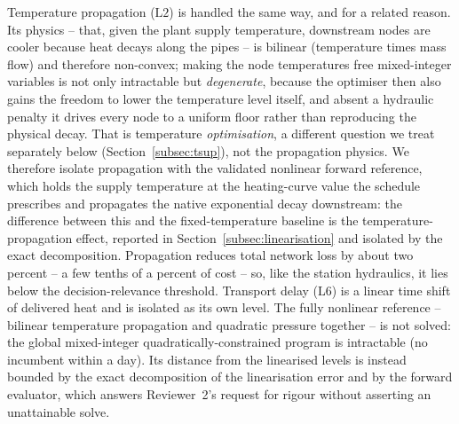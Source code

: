 \documentclass[a4paper,fleqn]{cas-dc}
\newcommand{\Ltwo}{\ensuremath{\mathrm{L2}}}    %
\newcommand{\Lsix}{\ensuremath{\mathrm{L6}}}    %
\begin{document}
Temperature propagation ($\Ltwo$) is handled the same way, and for a related reason. Its physics
-- that, given the plant supply temperature, downstream nodes are cooler because heat decays
along the pipes -- is bilinear (temperature times mass flow) and therefore non-convex; making the
node temperatures free mixed-integer variables is not only intractable but \emph{degenerate},
because the optimiser then also gains the freedom to lower the temperature level itself, and
absent a hydraulic penalty it drives every node to a uniform floor rather than reproducing the
physical decay. That is temperature \emph{optimisation}, a different question we treat separately
below (Section~\ref{subsec:tsup}), not the propagation physics. We therefore isolate propagation
with the validated nonlinear forward reference, which holds the supply temperature at the
heating-curve value the schedule prescribes and propagates the native exponential decay
downstream: the difference between this and the fixed-temperature baseline is the
temperature-propagation effect, reported in Section~\ref{subsec:linearisation} and isolated by
the exact decomposition. Propagation reduces total network loss by about two percent -- a few
tenths of a percent of cost -- so, like the station hydraulics, it lies below the
decision-relevance threshold.
Transport delay ($\Lsix$) is a linear time shift of delivered heat and is isolated as its own
level. The fully nonlinear reference -- bilinear temperature propagation and quadratic
pressure together -- is not solved: the global mixed-integer quadratically-constrained program
is intractable (no incumbent within a day). Its distance from the linearised levels is instead
bounded by the exact decomposition of the linearisation error and by the forward evaluator,
which answers Reviewer~2's request for rigour without asserting an unattainable solve.
\end{document}

